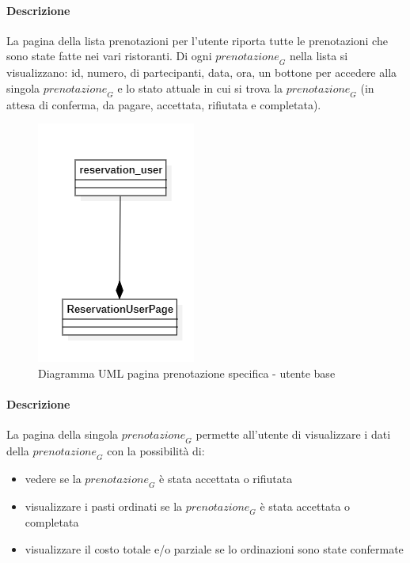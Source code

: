 \paragraph{Descrizione} La pagina della lista prenotazioni per l’utente riporta tutte le prenotazioni che sono state fatte nei vari ristoranti. Di ogni $\textit{prenotazione}_G$ nella lista si visualizzano: id, numero, di partecipanti, data, ora, un bottone per accedere alla singola $\textit{prenotazione}_G$ e lo stato attuale in cui si trova la $\textit{prenotazione}_G$ (in attesa di conferma, da pagare, accettata, rifiutata e completata).


\begin{figure}[H]
    \centering
    \includegraphics[width=0.3\linewidth]{images/user_reservation_page.png}
    \caption{Diagramma UML pagina prenotazione specifica - utente base}
    \label{fig:UML-user_reservationS_page}
\end{figure}
\paragraph{Descrizione} La pagina della singola $\textit{prenotazione}_G$ permette all’utente di visualizzare i dati della $\textit{prenotazione}_G$ con la possibilità di:
\begin{itemize}
    \item vedere se la $\textit{prenotazione}_G$ è stata accettata o rifiutata
    \item visualizzare i pasti ordinati se la $\textit{prenotazione}_G$ è stata accettata o completata
    \item visualizzare il costo totale e/o parziale se lo ordinazioni sono state confermate
\end{itemize}


\newpage
